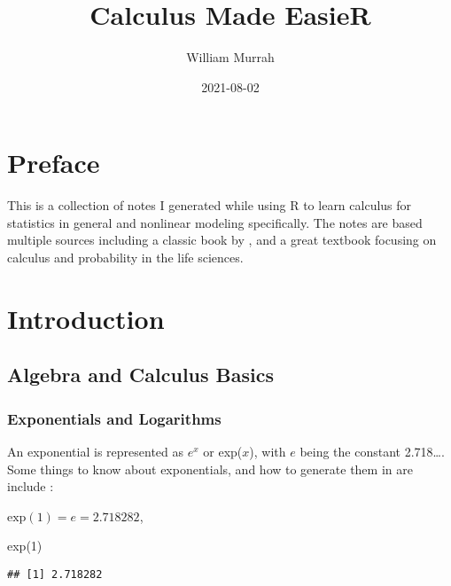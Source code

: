 \documentclass[
]{book}
\title{Calculus Made EasieR}
\author{William Murrah}
\date{2021-08-02}
\newenvironment{Shaded}{\begin{snugshade}}{\end{snugshade}}
\newcommand{\DecValTok}[1]{\textcolor[rgb]{0.00,0.00,0.81}{#1}}
\newcommand{\FunctionTok}[1]{\textcolor[rgb]{0.00,0.00,0.00}{#1}}
\newcommand{\NormalTok}[1]{#1}
\begin{document}
\maketitle

{
\setcounter{tocdepth}{1}
\tableofcontents
}
\hypertarget{preface}{%
\chapter*{Preface}\label{preface}}

This is a collection of notes I generated while using R to learn calculus for statistics in general and nonlinear modeling specifically.
The notes are based multiple sources including a classic book by \citet{thompson1998calculus}, and a great textbook focusing on calculus and probability in the life sciences\citep{adler2012modeling}.

\hypertarget{intro}{%
\chapter{Introduction}\label{intro}}

\hypertarget{algebra-and-calculus-basics}{%
\section{Algebra and Calculus Basics}\label{algebra-and-calculus-basics}}

\hypertarget{exponentials-and-logarithms}{%
\subsection{Exponentials and Logarithms}\label{exponentials-and-logarithms}}

An exponential is represented as \(e^x\) or exp(\(x\)), with \(e\) being the constant 2.718\ldots.
Some things to know about exponentials, and how to generate them in are include \citep{bolker2008ecological}:

\(\text{exp}(1) = e = 2.718282\),

\begin{Shaded}
\begin{Highlighting}[]
\FunctionTok{exp}\NormalTok{(}\DecValTok{1}\NormalTok{)}
\end{Highlighting}
\end{Shaded}

\begin{verbatim}
## [1] 2.718282
\end{verbatim}
\end{document}
